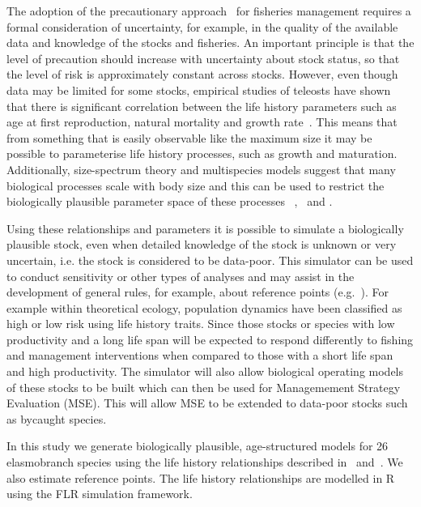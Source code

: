 \documentclass[a4paper, 10pt]{article}
\begin{document}
The adoption of the precautionary approach~\citet{nla.cat-vn1639801} for fisheries management requires
a formal consideration of uncertainty, for example, in the quality of the available
data and knowledge of the stocks and fisheries. An important principle is that the
level of precaution should increase with uncertainty about stock status, so that
the level of risk is approximately constant across stocks.
However, even though data may be limited for some stocks, empirical studies of teleosts
have shown that there is significant correlation between the life history parameters
such as age at first reproduction, natural mortality and growth rate~\citet{roff1984evolution}. This means
that from something that is easily observable like the maximum size it may be
possible to parameterise life history processes, such as growth and maturation.
Additionally, size-spectrum theory and multispecies models suggest that many biological processes
scale with body size and this can be used to restrict the biologically plausible
parameter space of these processes ~\citet{andersen2006asymptotic},~\citet{pope2006modelling} and \citet{gislason2008coexistence}.

Using these relationships and parameters it is possible to simulate a biologically plausible stock,
even when detailed knowledge of the stock is unknown or very uncertain, i.e. the stock is considered
to be data-poor. This simulator can be used to conduct sensitivity or other types of analyses
and may assist in the development of general rules, for example, about reference points (e.g.~\citet{williams2003implications}).
For example within theoretical ecology, population dynamics have been classified as high or low risk using life
history traits. Since those stocks or species with low productivity and a long life span will be expected to respond differently to
fishing and management interventions when compared to those with a short life span and high productivity.
The simulator will also allow biological operating models of these stocks to be built which can then
be used for Managemement Strategy Evaluation (MSE). This will allow MSE to be extended
to data-poor stocks such as bycaught species.

In this study we generate biologically plausible, age-structured models for 26 elasmobranch species
using the life history relationships described in~\citet{gislason2010does} and~\citet{gislason2008coexistence}.
We also estimate reference points.
The life history relationships are modelled in R using the FLR simulation framework.
\end{document}
